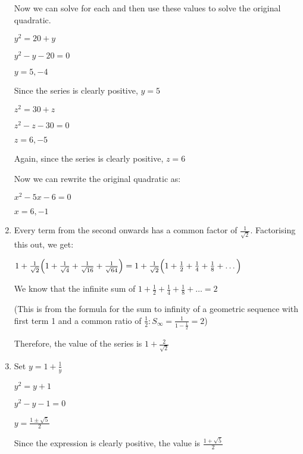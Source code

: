 \documentclass[../main.tex]{subfiles}
\begin{document}
\begin{enumerate}[itemsep=1cm]
    Now we can solve for each and then use these values to solve the original quadratic.

    $y^2=20+y$

    $y^2-y-20=0$

    $y=5, -4$

    Since the series is clearly positive, $y=5$

    $z^2=30+z$

    $z^2-z-30=0$

    $z=6, -5$

    Again, since the series is clearly positive, $z=6$

    Now we can rewrite the original quadratic as:

    $x^2-5x-6=0$

    $x=6, -1$

    \item 
    Every term from the second onwards has a common factor of $\frac{1}{\sqrt{2}}$. Factorising this out, we get:

    $1+\frac{1}{\sqrt{2}}\Bigl(1+\frac{1}{\sqrt{4}}+\frac{1}{\sqrt{16}}+\frac{1}{\sqrt{64}}\Bigr)=1+\frac{1}{\sqrt{2}}\Bigl(1+\frac{1}{2}+\frac{1}{4}+\frac{1}{8}+\dots\Bigr)$

    We know that the infinite sum of $1+\frac{1}{2}+\frac{1}{4}+\frac{1}{8}+\dots=2$

    (This is from the formula for the sum to infinity of a geometric sequence with first term 1 and a common ratio of $\frac{1}{2} : S_\infty=\frac{1}{1-\frac{1}{2}}=2$)

    Therefore, the value of the series is $1+\frac{2}{\sqrt{2}}$

    \item 
    Set $y=1+\frac{1}{y}$

    $y^2=y+1$
    
    $y^2-y-1=0$

    $y=\frac{1\pm \sqrt{5}}{2}$

    Since the expression is clearly positive, the value is $\frac{1+\sqrt{5}}{2}$

\end{enumerate}
\end{document}
